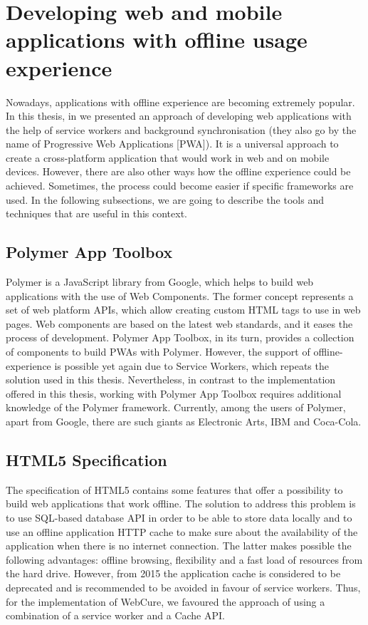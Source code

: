 \section{Developing web and mobile applications with offline usage experience}

Nowadays, applications with offline experience are becoming extremely popular. In this thesis, in  we presented an approach of developing web applications with the help of service workers and background synchronisation (they also go by the name of Progressive Web Applications [PWA]). It is a universal approach to create a cross-platform application that would work in web and on mobile devices. However, there are also other ways how the offline experience could be achieved. Sometimes, the process could become easier if specific frameworks are used. In the following subsections, we are going to describe the tools and techniques that are useful in this context. 


\subsection*{Polymer App Toolbox}

Polymer is a JavaScript library from Google, which helps to build web applications with the use of Web Components. The former concept represents a set of web platform APIs, which allow creating custom HTML tags to use in web pages\cite{16}. Web components are based on the latest web standards, and it eases the process of development. Polymer App Toolbox, in its turn, provides a collection of components to build PWAs with Polymer. However, the support of offline-experience is possible yet again due to Service Workers\cite{18}, which repeats the solution used in this thesis. Nevertheless, in contrast to the implementation offered in this thesis, working with Polymer App Toolbox requires additional knowledge of the Polymer framework. Currently, among the users of Polymer, apart from Google, there are such giants as Electronic Arts, IBM and Coca-Cola\cite{17}.

\subsection*{HTML5 Specification}

The specification of HTML5 contains some features that offer a possibility to build web applications that work offline. The solution to address this problem is to use SQL-based database API in order to be able to store data locally and to use an offline application HTTP cache to make sure about the availability of the application when there is no internet connection. The latter makes possible the following advantages: offline browsing, flexibility and a fast load of resources from the hard drive\cite{20}. However, from 2015 the application cache is considered to be deprecated and is recommended to be avoided\cite{21} in favour of service workers. Thus, for the implementation of WebCure, we favoured the approach of using a combination of a service worker and a Cache API.
 
